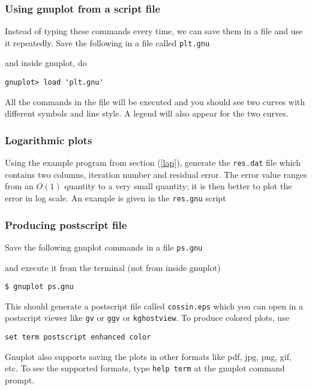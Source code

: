 \documentclass[11pt,oneside]{amsart}
\begin{document}
\subsubsection{Using gnuplot from a script file}
Instead of typing these commands every time, we can save them in a file and use it repeatedly. Save the following in a file called {\tt plt.gnu}

and inside gnuplot, do
\begin{verbatim}
gnuplot> load 'plt.gnu'
\end{verbatim}
All the commands in the file will be executed and you should see two curves with different symbols and line style. A legend will also appear for the two curves.

\subsubsection{Logarithmic plots}
Using the example program from section (\ref{lap}), generate the {\tt res.dat} file which contains two columns, iteration number and residual error. The error value ranges from an $O(1)$ quantity to a very small quantity; it is then better to plot the error in log scale. An example is given in the {\tt res.gnu} script

\subsubsection{Producing postscript file}
Save the following gnuplot commands in a file {\tt ps.gnu}

and execute it from the terminal (not from inside gnuplot)
\begin{verbatim}
$ gnuplot ps.gnu
\end{verbatim}
This should generate a postscript file called {\tt cossin.eps} which you can open in a postscript viewer like {\tt gv} or {\tt ggv} or {\tt kghostview}. To produce colored plots, use
\begin{verbatim}
set term postscript enhanced color
\end{verbatim}
Gnuplot also supports saving the plots in other formats like pdf, jpg, png, gif, etc. To see the supported formats, type {\tt help term} at the gnuplot command prompt.
\end{document}

